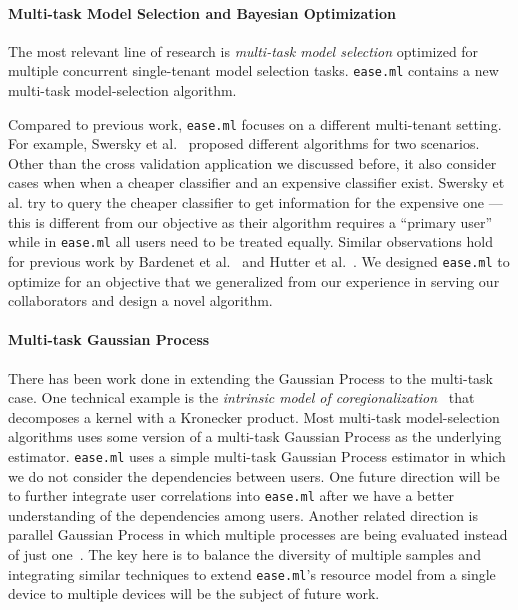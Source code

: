 \documentclass[letterpaper]{vldb}
\newcommand{\eml}{\texttt{ease.ml}\xspace}
\begin{document}
\paragraph*{Multi-task Model Selection and Bayesian Optimization} 
The most relevant line of research is {\em multi-task model selection}
optimized for multiple concurrent single-tenant model selection tasks.
\eml contains a new multi-task model-selection algorithm. 

Compared to previous work, \eml focuses
on a different multi-tenant setting. For example, Swersky et al.~\cite{Swersky2013}
proposed different algorithms for two scenarios. 
Other than the cross validation application we discussed before,
it also consider cases when
when a cheaper classifier and an expensive classifier exist.
Swersky et al.
try to query the cheaper classifier to get information
for the expensive one --- this is different from our objective
as their algorithm requires a ``primary user'' while in \eml
all users need to be treated equally. Similar observations
hold for previous work by Bardenet et al.~\cite{Bardenet2013} and Hutter et al.~\cite{Hutter2011}.
We designed \eml to optimize for an objective
that we generalized from our experience in serving our collaborators
and design a novel algorithm. 

\vspace{-1em}
\paragraph*{Multi-task Gaussian Process}
There has been work done in extending the Gaussian Process to the 
multi-task case. One technical example is the {\em intrinsic model
of coregionalization}~\cite{Goovaerts1997} that decomposes
a kernel with a Kronecker product. Most 
multi-task model-selection algorithms uses some version of
a multi-task Gaussian Process as the underlying estimator.
\eml uses a simple multi-task Gaussian Process estimator in which we
do not consider the dependencies between users. One 
future direction will be to further integrate user correlations 
into \eml after we have a better understanding of the dependencies
 among users.
Another related direction is parallel Gaussian Process in which multiple
processes are being evaluated instead of just one~\cite{Desautels2014}.
The key here is to balance the diversity of multiple samples
and integrating similar techniques
to extend \eml's resource model from a single device to multiple devices will be the subject of future work.
\end{document}
